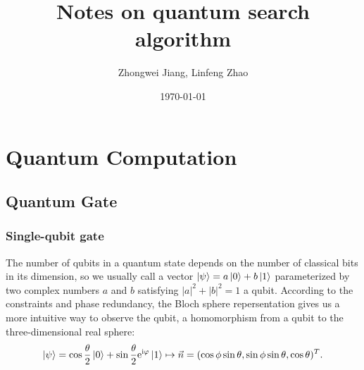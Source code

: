 \documentclass[a4paper,10pt]{article}
\title{Notes on quantum search algorithm}
\author{Zhongwei Jiang, Linfeng Zhao}
\date{\today}
\numberwithin{equation}{subsection}
\begin{document}
\maketitle

\section{Quantum Computation}

\subsection{Quantum Gate}

\subsubsection{Single-qubit gate}

The number of qubits in a quantum state depends on the number of classical bits in its dimension, so we usually call a vector $\ket{\psi} = a\ket{0} + b\ket{1}$ parameterized by two complex numbers $a$ and $b$ satisfying $|a|^2 + |b|^2 = 1$ a qubit. According to the constraints and phase redundancy, the Bloch sphere repersentation gives us a more intuitive way to observe the qubit, a homomorphism from a qubit to the three-dimensional real sphere:
\begin{equation}\label{BlochSphereRepersentation}
    \ket{\psi} = \cos \frac{\theta}{2}\ket{0} + \sin \frac{\theta}{2}\mathrm{e}^{\mathrm{i}\varphi }\ket{1} \mapsto \vec{n}=(\cos\phi\sin\theta,\sin\phi\sin\theta,\cos\theta)^{T}.
\end{equation}
\end{document}
